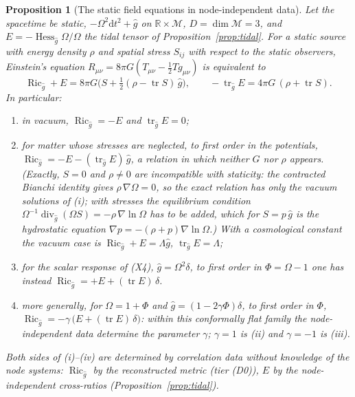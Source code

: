 \documentclass[11pt,a4paper]{article}
\theoremstyle{stmt}
\newtheorem{proposition}[theorem]{Proposition}
\theoremstyle{defn}
\theoremstyle{rmk}
\numberwithin{equation}{section}
\DeclareMathOperator{\tr}{tr}
\DeclareMathOperator{\Ric}{Ric}
\newcommand{\M}{\mathcal{M}}
\newcommand{\R}{\mathbb{R}}
\newcommand{\dd}{\mathrm{d}}
\begin{document}
{\begin{proposition}[The static field equations in node-independent data]\label{prop:static-test}
Let the spacetime be static, $-\Omega^2\dd t^2+\hat g$ on $\R\times\M$, $D=\dim\M=3$, and $E=-\operatorname{Hess}_{\hat g}\Omega/\Omega$ the tidal tensor of Proposition~\ref{prop:tidal}. For a static source with energy density $\rho$ and spatial stress $S_{ij}$ with respect to the static observers, Einstein's equation $R_{\mu\nu}=8\pi G(T_{\mu\nu}-\tfrac12Tg_{\mu\nu})$ is equivalent to
\begin{equation}\label{eq:static-test}
\Ric_{\hat g}+E=8\pi G\Big(S+\tfrac12(\rho-\tr S)\,\hat g\Big),\qquad -\tr_{\hat g}E=4\pi G\,(\rho+\tr S).
\end{equation}
In particular:
\begin{enumerate}
\item[(i)] in vacuum, $\Ric_{\hat g}=-E$ and $\tr_{\hat g}E=0$;
\item[(ii)] for matter whose stresses are neglected, to first order in the potentials, $\Ric_{\hat g}=-E-(\tr_{\hat g}E)\,\hat g$, a relation in which neither $G$ nor $\rho$ appears. (Exactly, $S=0$ and $\rho\ne0$ are incompatible with staticity: the contracted Bianchi identity gives $\rho\,\nabla\Omega=0$, so the exact relation has only the vacuum solutions of \textup{(i)}; with stresses the equilibrium condition $\Omega^{-1}\operatorname{div}_{\hat g}(\Omega S)=-\rho\,\nabla\ln\Omega$ has to be added, which for $S=p\,\hat g$ is the hydrostatic equation $\nabla p=-(\rho+p)\nabla\ln\Omega$.) With a cosmological constant the vacuum case is $\Ric_{\hat g}+E=\Lambda\hat g$, $\tr_{\hat g}E=\Lambda$;
\item[(iii)] for the scalar response of \textup{(X4)}, $\hat g=\Omega^2\delta$, to first order in $\Phi=\Omega-1$ one has instead $\Ric_{\hat g}=+E+(\tr E)\,\delta$.
\item[(iv)] more generally, for $\Omega=1+\Phi$ and $\hat g=(1-2\gamma\Phi)\delta$, to first order in $\Phi$, $\Ric_{\hat g}=-\gamma\,\big(E+(\tr E)\,\delta\big)$: within this conformally flat family the node-independent data determine the parameter $\gamma$; $\gamma=1$ is \textup{(ii)} and $\gamma=-1$ is \textup{(iii)}.
\end{enumerate}
Both sides of \textup{(i)}--\textup{(iv)} are determined by correlation data without knowledge of the node systems: $\Ric_{\hat g}$ by the reconstructed metric (tier \textup{(D0)}), $E$ by the node-independent cross-ratios (Proposition~\ref{prop:tidal}).
\end{proposition}

}
\end{document}
